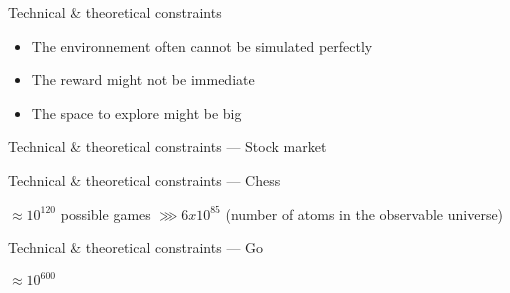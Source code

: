 \begin{frame}{Technical \& theoretical constraints}
  \begin{itemize}[<+->]
    \item The environnement often cannot be simulated perfectly 
    \item The reward might not be immediate
    \item The space to explore might be big
  \end{itemize}
\end{frame}

\begin{frame}{Technical \& theoretical constraints --- Stock market}
\end{frame}

\begin{frame}{Technical \& theoretical constraints --- Chess}
  \pause
  \begin{center}
    $\approx 10^{120}$ possible games $\ggg 6 x 10^{85}$
    \newline
    (number of atoms in the observable universe)
  \end{center}
\end{frame}

\begin{frame}{Technical \& theoretical constraints --- Go}
  \begin{center}
    \huge{$\approx 10^{600}$}
  \end{center}
\end{frame}
